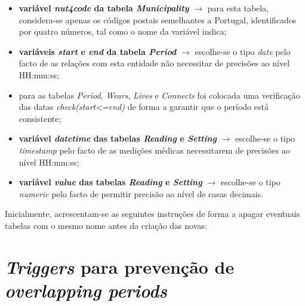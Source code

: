 \documentclass[a4paper]{article}
\begin{document}
\begin{itemize}
  \item \textbf{variável \textit{nut4code} da tabela \textit{Municipality}} $\rightarrow$ para esta tabela, considera-se apenas os códigos postais semelhantes a Portugal, identificados por quatro números, tal como o nome da variável indica;
  
  \item \textbf{variáveis \textit{start} e \textit{end} da tabela \textit{Period}} $\rightarrow$ escolhe-se o tipo \textit{date} pelo facto de as relações com esta entidade não necessitar de precisões ao nível HH:mm:ss;
  
  \item para as tabelas \textit{Period}, \textit{Wears}, \textit{Lives} e \textit{Connects} foi colocada uma verificação das datas \textit{check(start<=end)} de forma a garantir que o período está consistente;

  \item \textbf{variável \textit{datetime} das tabelas \textit{Reading} e \textit{Setting}} $\rightarrow$ escolhe-se o tipo \textit{timestamp} pelo facto de as medições médicas necessitarem de precisões ao nível HH:mm:ss;
  
  \item \textbf{variável \textit{value} das tabelas \textit{Reading} e \textit{Setting}} $\rightarrow$ escolhe-se o tipo \textit{numeric} pelo facto de permitir precisão ao nível de casas decimais.  
\end{itemize}
\pagebreak
Inicialmente, acrescentam-se as seguintes instruções de forma a apagar eventuais tabelas com o mesmo nome antes da criação das novas:



\section{\textit{Triggers} para prevenção de \textit{overlapping periods}}
\end{document}
